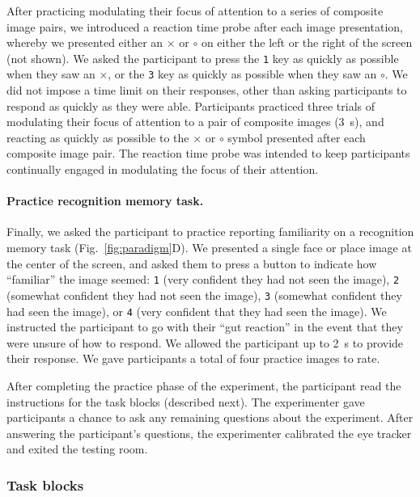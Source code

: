 \documentclass[english]{article}
\begin{document}
After practicing modulating their focus of attention to a series of composite
image pairs, we introduced a reaction time probe after each image presentation,
whereby we presented either an $\times$ or $\circ$ on either the left or the
right of the screen (not shown). We asked the participant to press the
\texttt{1} key as quickly as possible when they saw an $\times$, or the
\texttt{3} key as quickly as possible when they saw an $\circ$. We did not
impose a time limit on their responses, other than asking participants to
respond as quickly as they were able. Participants practiced three trials of
modulating their focus of attention to a pair of composite images (3~s), and
reacting as quickly as possible to the $\times$ or $\circ$ symbol presented
after each composite image pair. The reaction time probe was intended to keep
participants continually engaged in modulating the focus of their attention.

\paragraph{Practice recognition memory task.}

Finally, we asked the participant to practice reporting familiarity on a
recognition memory task (Fig.~\ref{fig:paradigm}D). We presented a single face
or place image at the center of the screen, and asked them to press a button to
indicate how ``familiar'' the image seemed: \texttt{1} (very confident they had
not seen the image), \texttt{2} (somewhat confident they had not seen the
image), \texttt{3} (somewhat confident they had seen the image), or \texttt{4}
(very confident that they had seen the image). We instructed the participant to
go with their ``gut reaction'' in the event that they were unsure of how to
respond. We allowed the participant up to 2~s to provide their response. We
gave participants a total of four practice images to rate.

After completing the practice phase of the experiment, the participant read the
instructions for the task blocks (described next). The experimenter gave
participants a chance to ask any remaining questions about the experiment.
After answering the participant's questions, the experimenter calibrated the
eye tracker and exited the testing room.

\subsubsection*{Task blocks}
\end{document}
